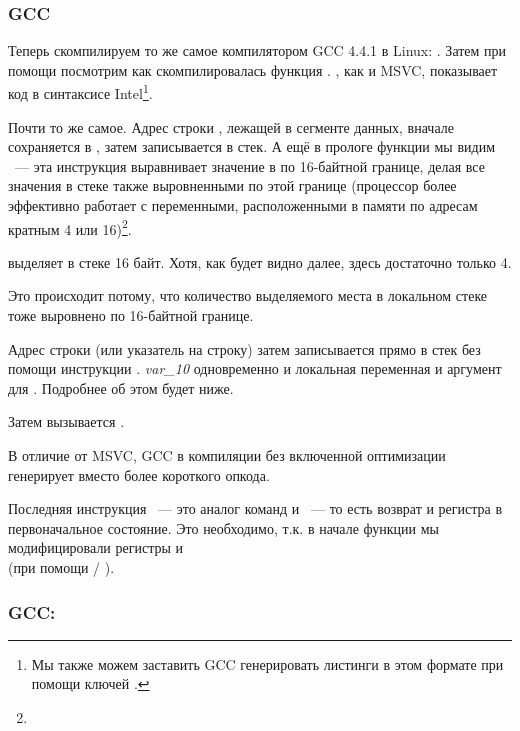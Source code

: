 \subsubsection{GCC}

Теперь скомпилируем то же самое компилятором GCC 4.4.1 в Linux: .
Затем при помощи \IDA посмотрим как скомпилировалась функция \main.
\IDA, как и MSVC, показывает код в синтаксисе Intel\footnote{Мы также можем заставить GCC генерировать листинги в этом формате при помощи ключей .}.



Почти то же самое. 
Адрес строки , лежащей в сегменте данных, вначале сохраняется в \EAX, затем записывается в стек.
А ещё в прологе функции мы видим ~--- 
эта инструкция выравнивает значение в \ESP по 16-байтной границе, делая все значения 
в стеке также выровненными по этой границе (процессор более эффективно работает с переменными, расположенными
в памяти по адресам кратным 4 или 16)\footnote{\URLWPDA}.

 выделяет в стеке 16 байт. Хотя, как будет видно далее, здесь достаточно только 4.

Это происходит потому, что количество выделяемого места в локальном стеке тоже выровнено по 16-байтной границе.

Адрес строки (или указатель на строку) затем записывается прямо в стек без помощи инструкции \PUSH.
\emph{var\_10} одновременно и локальная переменная и аргумент для \printf{}. Подробнее об этом будет ниже.

Затем вызывается \printf.

В отличие от MSVC, GCC в компиляции без включенной оптимизации генерирует  вместо более короткого опкода.

Последняя инструкция \LEAVE~--- это аналог команд  и ~--- то есть возврат  и регистра \EBP в первоначальное состояние.
Это необходимо, т.к. в начале функции мы модифицировали регистры \ESP и \EBP{}\\
(при помощи  / ).

\subsubsection{GCC: \ATTSyntax}
\label{ATT_syntax}

